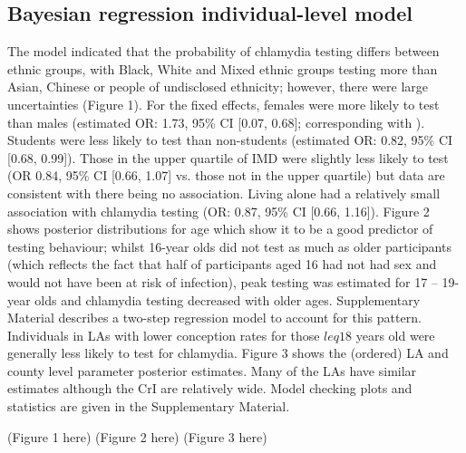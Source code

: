 \documentclass[fleqn,10pt]{wlscirep}
\begin{document}
\subsection*{Bayesian regression individual-level model}
The model indicated that the probability of chlamydia testing differs between ethnic groups, with Black, White and Mixed ethnic groups testing more than Asian, Chinese or people of undisclosed ethnicity; however, there were large uncertainties (Figure 1). For the fixed effects, females were more likely to test than males (estimated OR: 1.73, 95\% CI [0.07, 0.68]; corresponding with \cite{Sonnenberg2013}). Students were less likely to test than non-students (estimated OR: 0.82, 95\% CI [0.68, 0.99]). Those in the upper quartile of IMD were slightly less likely to test (OR 0.84, 95\% CI [0.66, 1.07] vs. those not in the upper quartile) but data are consistent with there being no association. Living alone had a relatively small association with chlamydia testing (OR: 0.87, 95\% CI [0.66, 1.16]). Figure 2 shows posterior distributions for age which show it to be a good predictor of testing behaviour; whilst 16-year olds did not test as much as older participants (which reflects the fact that half of participants aged 16 had not had sex and would not have been at risk of infection), peak testing was estimated for 17 – 19-year olds and chlamydia testing decreased with older ages. Supplementary Material describes a two-step regression model to account for this pattern. Individuals in LAs with lower conception rates for those $leq 18$ years old were generally less likely to test for chlamydia. Figure 3 shows the (ordered) LA and county level parameter posterior estimates. Many of the LAs have similar estimates although the CrI are relatively wide. Model checking plots and statistics are given in the Supplementary Material.

(Figure 1 here)
(Figure 2 here)
(Figure 3 here)
\end{document}
